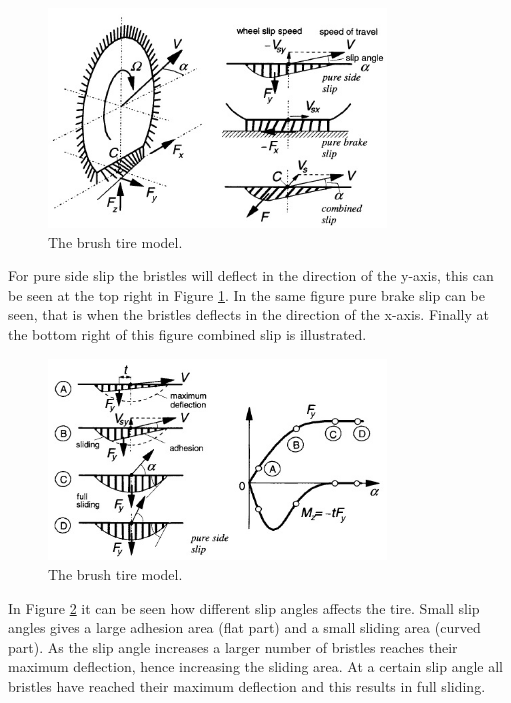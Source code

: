 \begin{figure}[h]
	\centering
	\includegraphics[width=0.8\textwidth]{Pictures/brush1}
	\caption{The brush tire model. \cite{pacejka}}
	\label{brush1}
\end{figure}

For pure side slip the bristles will deflect in the direction of the y-axis, this can be seen at the top right in Figure \ref{brush1}. In the same figure pure brake slip can be seen, that is when the bristles deflects in the direction of the x-axis. Finally at the bottom right of this figure combined slip is illustrated.

\begin{figure}[h]
	\centering
	\includegraphics[width=0.8\textwidth]{Pictures/brush2}
	\caption{The brush tire model. \cite{pacejka}}
	\label{brush2}
\end{figure}

In Figure \ref{brush2} it can be seen how different slip angles affects the tire. Small slip angles gives a large adhesion area (flat part) and a small sliding area (curved part). As the slip angle increases a larger number of bristles reaches their maximum deflection, hence increasing the sliding area. At a certain slip angle all bristles have reached their maximum deflection and this results in full sliding. 

